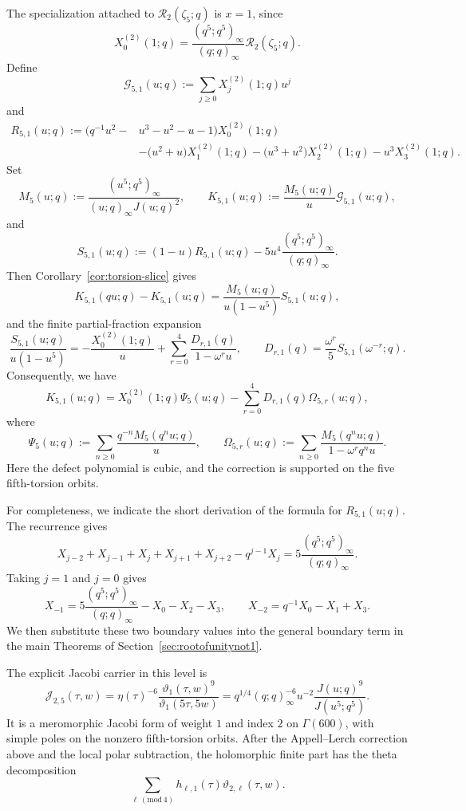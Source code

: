 \documentclass[12pt]{amsart}
\numberwithin{equation}{section}
\newcommand{\RRm}{\mathcal R}
\begin{document}
The specialization attached to \(\RRm_2(\zeta_5;q)\) is \(x=1\), since
\[
X_0^{(2)}(1;q)=\frac{(q^5;q^5)_\infty}{(q;q)_\infty}\RRm_2(\zeta_5;q).
\]
Define
\[
\mathcal G_{5,1}(u;q):=\sum_{j\geq 0}X_j^{(2)}(1;q)u^j
\]
and
\begin{displaymath}
\begin{split}
R_{5,1}(u;q)
:=
\bigl(q^{-1}u^2-&u^3-u^2-u-1\bigr)X_0^{(2)}(1;q) \\
&-\bigl(u^2+u\bigr)X_1^{(2)}(1;q)
-
\bigl(u^3+u^2\bigr)X_2^{(2)}(1;q)
-u^3X_3^{(2)}(1;q).
\end{split}
\end{displaymath}
Set
\[
M_5(u;q):=\frac{(u^5;q^5)_\infty}{(u;q)_\infty J(u;q)^2},
\qquad
K_{5,1}(u;q):=\frac{M_5(u;q)}{u}\mathcal G_{5,1}(u;q),
\]
and
\[
S_{5,1}(u;q):=(1-u)R_{5,1}(u;q)-5u^4\frac{(q^5;q^5)_\infty}{(q;q)_\infty}.
\]
Then Corollary~\ref{cor:torsion-slice} gives
\[
K_{5,1}(qu;q)-K_{5,1}(u;q)
=
\frac{M_5(u;q)}{u(1-u^5)}S_{5,1}(u;q),
\]
and the finite partial-fraction expansion
\[
\frac{S_{5,1}(u;q)}{u(1-u^5)}
=
-\frac{X_0^{(2)}(1;q)}{u}
+
\sum_{r=0}^4\frac{D_{r,1}(q)}{1-\omega^r u},
\qquad
D_{r,1}(q)=\frac{\omega^r}{5}S_{5,1}(\omega^{-r};q).
\]
Consequently, we have
\[
K_{5,1}(u;q)
=
X_0^{(2)}(1;q)\Psi_5(u;q)-\sum_{r=0}^4D_{r,1}(q)\Omega_{5,r}(u;q),
\]
where
\[
\Psi_5(u;q):=\sum_{n\geq0}\frac{q^{-n}M_5(q^nu;q)}{u},
\qquad
\Omega_{5,r}(u;q):=\sum_{n\geq0}\frac{M_5(q^nu;q)}{1-\omega^rq^nu}.
\]
Here the defect polynomial is cubic, and the correction is supported on the five fifth-torsion orbits.

For completeness, we indicate the short derivation of the formula for $R_{5,1}(u;q).$   The recurrence gives
\[
X_{j-2}+X_{j-1}+X_j+X_{j+1}+X_{j+2}-q^{j-1}X_j=5\frac{(q^5;q^5)_\infty}{(q;q)_\infty}.
\]
Taking \(j=1\) and \(j=0\) gives
\[
X_{-1}=5\frac{(q^5;q^5)_\infty}{(q;q)_\infty}-X_0-X_2-X_3,
\qquad
X_{-2}=q^{-1}X_0-X_1+X_3.
\]
We then substitute these two boundary values into the general boundary term in the main Theorems of Section~\ref{sec:rootofunitynot1}.

The explicit Jacobi carrier in this level is
\[
\mathcal J_{2,5}(\tau,w)
=
\eta(\tau)^{-6}\frac{\vartheta_1(\tau,w)^9}{\vartheta_1(5\tau,5w)}
=
q^{1/4}(q;q)_\infty^{-6}u^{-2}\frac{J(u;q)^9}{J(u^5;q^5)}.
\]
It is a meromorphic Jacobi form of weight \(1\) and index \(2\) on \(\Gamma(600)\), with simple poles on the nonzero fifth-torsion orbits.  After the Appell--Lerch correction above and the local polar subtraction, the holomorphic finite part has the theta decomposition
\[
\sum_{\ell\, (\mathrm{mod}\,4)}h_{\ell,1}(\tau)\vartheta_{2,\ell}(\tau,w).
\]
\end{document}
